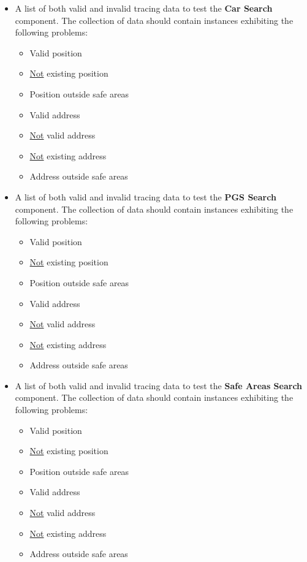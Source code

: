 \documentclass[english]{article}
\begin{document}
\begin{itemize}
    \item{A list of both valid and invalid tracing data to test the \textbf{Car Search} component.
    The collection of data should contain instances exhibiting the following problems:
    \begin{itemize}
      \item{Valid position}
      \item{\underline{Not} existing position}
      \item{Position outside safe areas}
      \item{Valid address}
      \item{\underline{Not} valid address}
      \item{\underline{Not} existing address}
      \item{Address outside safe areas}
    \end{itemize}}

    \item{A list of both valid and invalid tracing data to test the \textbf{PGS Search} component.
    The collection of data should contain instances exhibiting the following problems:
    \begin{itemize}
      \item{Valid position}
      \item{\underline{Not} existing position}
      \item{Position outside safe areas}
      \item{Valid address}
      \item{\underline{Not} valid address}
      \item{\underline{Not} existing address}
      \item{Address outside safe areas}
    \end{itemize}}

    \item{A list of both valid and invalid tracing data to test the \textbf{Safe Areas Search} component.
    The collection of data should contain instances exhibiting the following problems:
    \begin{itemize}
      \item{Valid position}
      \item{\underline{Not} existing position}
      \item{Position outside safe areas}
      \item{Valid address}
      \item{\underline{Not} valid address}
      \item{\underline{Not} existing address}
      \item{Address outside safe areas}
    \end{itemize}}


\end{itemize}
\end{document}
